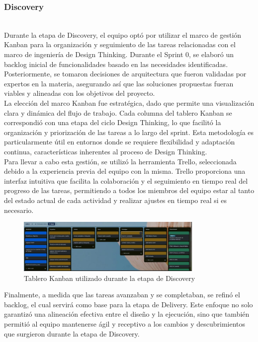 \subsubsection{Discovery} \\
Durante la etapa de Discovery, el equipo optó por utilizar el marco de gestión Kanban para la organización y seguimiento de las tareas relacionadas con el marco
de ingeniería de Design Thinking. Durante el Sprint 0, se elaboró un backlog inicial de funcionalidades basado en las necesidades identificadas. Posteriormente, 
se tomaron decisiones de arquitectura que fueron validadas por expertos en la materia, asegurando así que las soluciones propuestas fueran viables y alineadas con 
los objetivos del proyecto.\\
La elección del marco Kanban fue estratégica, dado que permite una visualización clara y dinámica del flujo de trabajo. Cada columna del tablero Kanban se 
correspondió con una etapa del ciclo Design Thinking, lo que facilitó la organización y priorización de las tareas a lo largo del sprint. Esta metodología es particularmente 
útil en entornos donde se requiere flexibilidad y adaptación continua, características inherentes al proceso de Design Thinking.\\
Para llevar a cabo esta gestión, se utilizó la herramienta Trello, seleccionada debido a la experiencia previa del equipo con la misma. Trello proporciona una interfaz intuitiva 
que facilita la colaboración y el seguimiento en tiempo real del progreso de las tareas, permitiendo a todos los miembros del equipo estar al tanto del estado actual de cada actividad y 
realizar ajustes en tiempo real si es necesario.\\

\begin{figure}[H]
    \centering
    \includegraphics[width=0.8\textwidth]{../imagenes/secciones/3-marco-metodologico/Tablero Kanban de tareas de la etapa de discovery.jpg}
    \caption{Tablero Kanban utilizado durante la etapa de Discovery}
    \label{fig:kanbanDiscovery}
\end{figure}

Finalmente, a medida que las tareas avanzaban y se completaban, se refinó el backlog, el cual servirá como base para la etapa de Delivery. Este enfoque no solo garantizó una 
alineación efectiva entre el diseño y la ejecución, sino que también permitió al equipo mantenerse ágil y receptivo a los cambios y descubrimientos que surgieron durante la 
etapa de Discovery.\\

